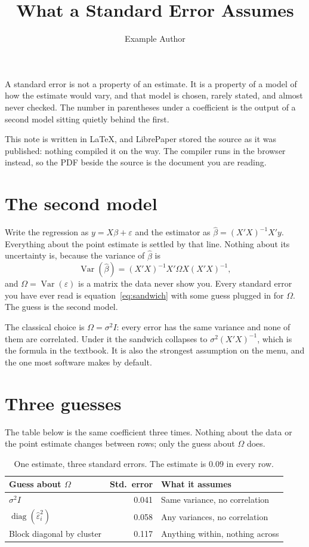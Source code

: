 \documentclass[11pt]{article}
\title{What a Standard Error Assumes}
\author{Example Author}
\date{}
\begin{document}
\maketitle

A standard error is not a property of an estimate. It is a property of a model of how the estimate would vary, and that model is chosen, rarely stated, and almost never checked. The number in parentheses under a coefficient is the output of a second model sitting quietly behind the first.

This note is written in \LaTeX, and LibrePaper stored the source as it was published: nothing compiled it on the way. The compiler runs in the browser instead, so the PDF beside the source is the document you are reading.

\section{The second model}

Write the regression as $y = X\beta + \varepsilon$ and the estimator as $\hat{\beta} = (X'X)^{-1}X'y$. Everything about the point estimate is settled by that line. Nothing about its uncertainty is, because the variance of $\hat{\beta}$ is
\begin{equation}
  \operatorname{Var}(\hat{\beta}) = (X'X)^{-1} X' \Omega X (X'X)^{-1},
  \label{eq:sandwich}
\end{equation}
and $\Omega = \operatorname{Var}(\varepsilon)$ is a matrix the data never show you. Every standard error you have ever read is equation~\eqref{eq:sandwich} with some guess plugged in for $\Omega$. The guess is the second model.

The classical choice is $\Omega = \sigma^2 I$: every error has the same variance and none of them are correlated. Under it the sandwich collapses to $\sigma^2 (X'X)^{-1}$, which is the formula in the textbook. It is also the strongest assumption on the menu, and the one most software makes by default.

\section{Three guesses}

The table below is the same coefficient three times. Nothing about the data or the point estimate changes between rows; only the guess about $\Omega$ does.

\begin{table}[h]
  \centering
  \begin{tabular}{lrl}
    \toprule
    Guess about $\Omega$ & Std.\ error & What it assumes \\
    \midrule
    $\sigma^2 I$ & 0.041 & Same variance, no correlation \\
    $\operatorname{diag}(\hat{\varepsilon}_i^2)$ & 0.058 & Any variances, no correlation \\
    Block diagonal by cluster & 0.117 & Anything within, nothing across \\
    \bottomrule
  \end{tabular}
  \caption{One estimate, three standard errors. The estimate is $0.09$ in every row.}
  \label{tab:three}
\end{table}
\end{document}
